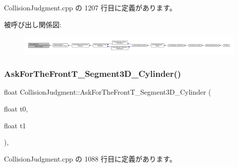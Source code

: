  Collision\+Judgment.\+cpp の 1207 行目に定義があります。

被呼び出し関係図\+:
\nopagebreak
\begin{figure}[H]
\begin{center}
\leavevmode
\includegraphics[width=350pt]{class_collision_judgment_a9b00e793394f46bdc74e6efa434c0255_icgraph}
\end{center}
\end{figure}
\mbox{\label{class_collision_judgment_a413d713064c810f1bea6760e76db5221}} 
\subsubsection{\texorpdfstring{Ask\+For\+The\+Front\+T\+\_\+\+Segment3\+D\+\_\+\+Cylinder()}{AskForTheFrontT\_Segment3D\_Cylinder()}}
{\footnotesize\ttfamily float Collision\+Judgment\+::\+Ask\+For\+The\+Front\+T\+\_\+\+Segment3\+D\+\_\+\+Cylinder (\begin{DoxyParamCaption}\item[{float}]{t0,  }\item[{float}]{t1 }\end{DoxyParamCaption})\hspace{0.3cm}{\ttfamily [static]}, {\ttfamily [private]}}



 Collision\+Judgment.\+cpp の 1088 行目に定義があります。

